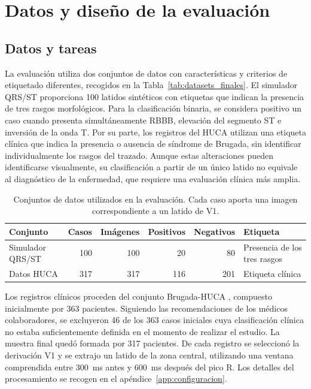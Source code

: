 \section{Datos y diseño de la evaluación}
\label{chap:diseno}

\subsection{Datos y tareas}
\label{sec:datos_tareas}

La evaluación utiliza dos conjuntos de datos con características y criterios de etiquetado diferentes, recogidos en la Tabla~\ref{tab:datasets_finales}. El simulador QRS/ST proporciona 100 latidos sintéticos con etiquetas que indican la presencia de tres rasgos morfológicos. Para la clasificación binaria, se considera positivo un caso cuando presenta simultáneamente RBBB, elevación del segmento ST e inversión de la onda T. Por su parte, los registros del HUCA utilizan una etiqueta clínica que indica la presencia o ausencia de síndrome de Brugada, sin identificar individualmente los rasgos del trazado. Aunque estas alteraciones pueden identificarse visualmente, su clasificación a partir de un único latido no equivale al diagnóstico de la enfermedad, que requiere una evaluación clínica más amplia.

\begin{table}[H]
  \centering
  \small
  \begin{tabularx}{\textwidth}{p{3cm}rrrr>{\raggedright\arraybackslash}X}
    \toprule
    Conjunto & Casos & Imágenes & Positivos & Negativos & Etiqueta \\
    \midrule
    Simulador QRS/ST & 100 & 100 & 20 & 80 & Presencia de los tres rasgos \\
    Datos HUCA & 317 & 317 & 116 & 201 & Etiqueta clínica \\
    \bottomrule
  \end{tabularx}
  \caption{Conjuntos de datos utilizados en la evaluación. Cada caso aporta una imagen correspondiente a un latido de V1.}
  \label{tab:datasets_finales}
  \label{tab:huca_datos_finales}
\end{table}

Los registros clínicos proceden del conjunto Brugada-HUCA \cite{costacortez2026brugada}, compuesto inicialmente por 363 pacientes. Siguiendo las recomendaciones de los médicos colaboradores, se excluyeron 46 de los 363 casos iniciales cuya clasificación clínica no estaba suficientemente definida en el momento de realizar el estudio. La muestra final quedó formada por 317 pacientes. De cada registro se seleccionó la derivación V1 y se extrajo un latido de la zona central, utilizando una ventana comprendida entre 300~ms antes y 600~ms después del pico R. Los detalles del procesamiento se recogen en el apéndice~\ref{app:configuracion}.

